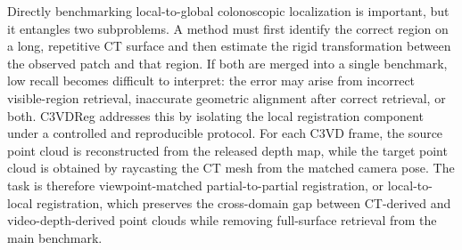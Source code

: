 \documentclass{bmvc2k}
\begin{document}
Directly benchmarking local-to-global colonoscopic localization is important, but it entangles two subproblems. A method must first identify the correct region on a long, repetitive CT surface and then estimate the rigid transformation between the observed patch and that region. If both are merged into a single benchmark, low recall becomes difficult to interpret: the error may arise from incorrect visible-region retrieval, inaccurate geometric alignment after correct retrieval, or both. C3VDReg addresses this by isolating the local registration component under a controlled and reproducible protocol. For each C3VD frame, the source point cloud is reconstructed from the released depth map, while the target point cloud is obtained by raycasting the CT mesh from the matched camera pose. The task is therefore viewpoint-matched partial-to-partial registration, or local-to-local registration, which preserves the cross-domain gap between CT-derived and video-depth-derived point clouds while removing full-surface retrieval from the main benchmark.
\end{document}
